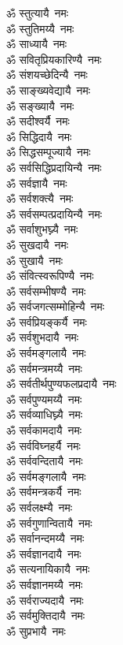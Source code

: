 \begin{flushleft}
\begin{multicols}{2}
ॐ स्तुत्यायै~नमः\\
ॐ स्तुतिमय्यै~नमः\hfill{}\\
ॐ साध्यायै~नमः\\
ॐ सवितृप्रियकारिण्यै~नमः\\
ॐ संशयच्छेदिन्यै~नमः\\
ॐ साङ्ख्यवेद्यायै~नमः\\
ॐ सङ्ख्यायै~नमः\\
ॐ सदीश्वर्यै~नमः\\
ॐ सिद्धिदायै~नमः\\
ॐ सिद्धसम्पूज्यायै~नमः\\
ॐ सर्वसिद्धिप्रदायिन्यै~नमः\\
ॐ सर्वज्ञायै~नमः\hfill{}\\
ॐ सर्वशक्त्यै~नमः\\
ॐ सर्वसम्पत्प्रदायिन्यै~नमः\\
ॐ सर्वाशुभघ्न्यै~नमः\\
ॐ सुखदायै~नमः\\
ॐ सुखायै~नमः\\
ॐ संवित्स्वरूपिण्यै~नमः\\
ॐ सर्वसम्भीषण्यै~नमः\\
ॐ सर्वजगत्सम्मोहिन्यै~नमः\\
ॐ सर्वप्रियङ्कर्यै~नमः\\
ॐ सर्वशुभदायै~नमः\hfill{}\\
ॐ सर्वमङ्गलायै~नमः\\
ॐ सर्वमन्त्रमय्यै~नमः\\
ॐ सर्वतीर्थपुण्यफलप्रदायै~नमः\\
ॐ सर्वपुण्यमय्यै~नमः\\
ॐ सर्वव्याधिघ्न्यै~नमः\\
ॐ सर्वकामदायै~नमः\\
ॐ सर्वविघ्नहर्यै~नमः\\
ॐ सर्ववन्दितायै~नमः\\
ॐ सर्वमङ्गलायै~नमः\\
ॐ सर्वमन्त्रकर्यै~नमः\hfill{}\\
ॐ सर्वलक्ष्म्यै~नमः\\
ॐ सर्वगुणान्वितायै~नमः\\
ॐ सर्वानन्दमय्यै~नमः\\
ॐ सर्वज्ञानदायै~नमः\\
ॐ सत्यनायिकायै~नमः\\
ॐ सर्वज्ञानमय्यै~नमः\\
ॐ सर्वराज्यदायै~नमः\\
ॐ सर्वमुक्तिदायै~नमः\\
ॐ सुप्रभायै~नमः\\

\end{multicols}
\end{flushleft}
